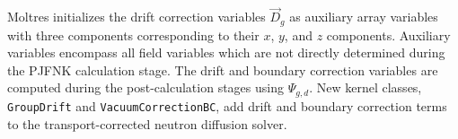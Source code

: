 

Moltres initializes the drift correction variables $\vec{D}_g$ as auxiliary array variables
with three components corresponding to their $x$, $y$, and $z$ components. Auxiliary variables
encompass all field variables which are not directly determined during the \gls{PJFNK}
calculation stage. The drift and boundary correction variables are computed during the
post-calculation stages using $\Psi_{g,d}$.
New kernel classes, \texttt{GroupDrift} and \texttt{VacuumCorrectionBC}, add
drift and boundary correction terms to the transport-corrected neutron diffusion solver.

